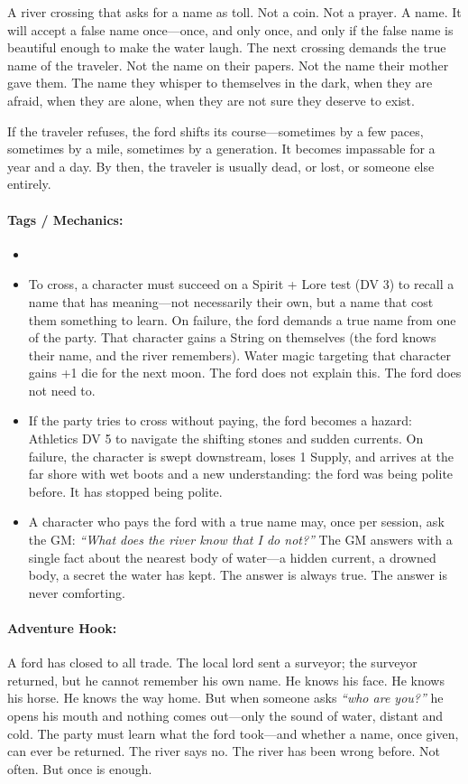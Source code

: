 A river crossing that asks for a name as toll. Not a coin. Not a prayer. A name. It will accept a false name once---once, and only once, and only if the false name is beautiful enough to make the water laugh. The next crossing demands the true name of the traveler. Not the name on their papers. Not the name their mother gave them. The name they whisper to themselves in the dark, when they are afraid, when they are alone, when they are not sure they deserve to exist.

If the traveler refuses, the ford shifts its course---sometimes by a few paces, sometimes by a mile, sometimes by a generation. It becomes impassable for a year and a day. By then, the traveler is usually dead, or lost, or someone else entirely.

\paragraph{Tags / Mechanics:}
\begin{itemize}
\item [THRESHOLD] [TRUTH] [SACRIFICE]
\item To cross, a character must succeed on a Spirit + Lore test (DV 3) to recall a name that has meaning---not necessarily their own, but a name that cost them something to learn. On failure, the ford demands a true name from one of the party. That character gains a String on themselves (the ford knows their name, and the river remembers). Water magic targeting that character gains +1 die for the next moon. The ford does not explain this. The ford does not need to.
\item If the party tries to cross without paying, the ford becomes a hazard: Athletics DV 5 to navigate the shifting stones and sudden currents. On failure, the character is swept downstream, loses 1 Supply, and arrives at the far shore with wet boots and a new understanding: the ford was being polite before. It has stopped being polite.
\item A character who pays the ford with a true name may, once per session, ask the GM: \textit{``What does the river know that I do not?''} The GM answers with a single fact about the nearest body of water---a hidden current, a drowned body, a secret the water has kept. The answer is always true. The answer is never comforting.
\end{itemize}

\paragraph{Adventure Hook:}
A ford has closed to all trade. The local lord sent a surveyor; the surveyor returned, but he cannot remember his own name. He knows his face. He knows his horse. He knows the way home. But when someone asks \textit{``who are you?''} he opens his mouth and nothing comes out---only the sound of water, distant and cold. The party must learn what the ford took---and whether a name, once given, can ever be returned. The river says no. The river has been wrong before. Not often. But once is enough.

